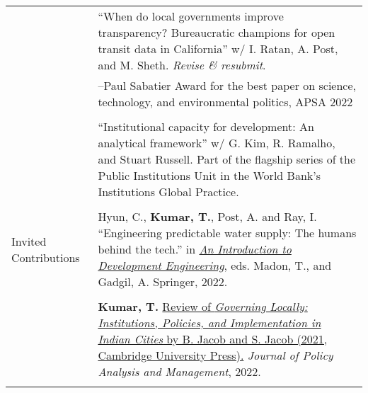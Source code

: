 \documentclass[letterpaper, 10.5pt]{article}
\begin{document}
\begin{longtable}{p{1.5in}p{5in}}
&``When do local governments improve transparency? 
Bureaucratic champions for open transit data in California'' w/ I. Ratan, A. Post, and M. Sheth. \textit{Revise \& resubmit}.\\
&--\indent Paul Sabatier Award for the best paper on science, technology, and environmental politics, APSA 2022\\
& \\
&``Institutional capacity for development: 
An analytical framework'' w/ G. Kim, R. Ramalho, and Stuart Russell. Part of the flagship series of the Public Institutions Unit in the World Bank's Institutions Global Practice.
\\
& \\



{{Invited Contributions}} 
& Hyun, C., \textbf{Kumar, T.}, Post, A. and Ray, I. ``Engineering predictable water supply: The humans behind the tech.'' in \href{https://link.springer.com/book/10.1007/978-3-030-86065-3}{\textit{An Introduction to Development Engineering}}, eds. Madon, T., and Gadgil, A. Springer, 2022.\\

& \\






& \textbf{Kumar, T.} \href{https://doi.org/10.1002/pam.22390}{Review of \textit{Governing Locally: Institutions, Policies, and Implementation in Indian Cities} by B. Jacob and S. Jacob (2021, Cambridge University Press).}  \textit{Journal of Policy Analysis and Management}, 2022. \\


& \\




\end{longtable}
\end{document}
